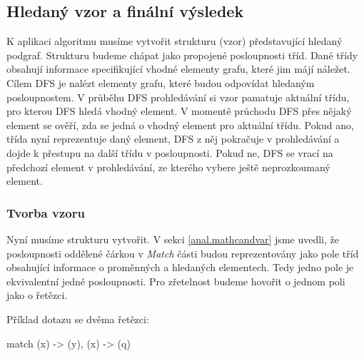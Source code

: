 \subsection{Hledaný vzor a finální výsledek} \label{anal.match.res}

K aplikaci algoritmu musíme vytvořit strukturu (vzor) představující hledaný podgraf.
Strukturu budeme chápat jako propojené posloupnosti tříd.
Dané třídy obsahují informace specifikující vhodné elementy grafu, které jim májí náležet.
Cílem DFS je nalézt elementy grafu, které budou odpovídat hledaným posloupnostem.
V průběhu DFS prohledávání si vzor pamatuje aktuální třídu, pro kterou DFS hledá vhodný element.
V momentě průchodu DFS přes nějaký element se ověří, zda se jedná o vhodný element pro aktuální třídu.
Pokud ano, třída nyní reprezentuje daný element, DFS z něj pokračuje v prohledávání a dojde k přestupu na další třídu v posloupnosti.
Pokud ne, DFS se vrací na předchozí element v prohledávání, ze kterého vybere ještě neprozkoumaný element.

\subsubsection{Tvorba vzoru}

Nyní musíme strukturu vytvořit.
V sekci \ref{anal.mathcandvar} jsme uvedli, že posloupnosti oddělené čárkou v \textit{Match} části budou reprezentovány jako pole tříd obsahující informace o proměnných a hledaných elementech.
Tedy jedno pole je ekvivalentní jedné posloupnosti.
Pro zřetelnost budeme hovořit o jednom poli jako o řetězci.

Příklad dotazu se dvěma řetězci:
\begin{code}
match (x) -> (y), (x) -> (q)
\end{code}

